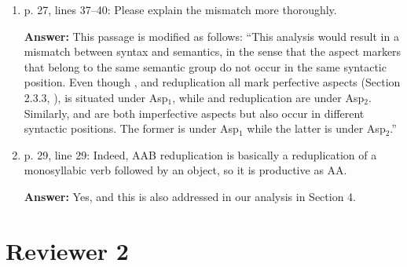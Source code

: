 \documentclass[fleqn,twoside]{article}
\begin{document}
\begin{enumerate}
\item p. 27, lines 37--40: Please explain the mismatch more thoroughly.

\noindent
\textbf{Answer:} This passage is modified as follows: 
``This analysis would result in a mismatch between syntax and semantics, 
in the sense that the aspect markers that belong to the same semantic group do not occur in the same syntactic position. 
Even though ,  and reduplication all mark perfective aspects (Section 2.3.3, \citealt{Dai1997, XiaoMcEnery2004}),
 is situated under Asp$_1$, while  and reduplication are under Asp$_2$.
Similarly,  and  are both imperfective aspects but also occur in different syntactic positions.
The former is under Asp$_1$ while the latter is under Asp$_2$.''

\item p. 29, line 29: Indeed, AAB reduplication is basically a reduplication of a monosyllabic verb followed
by an object, so it is productive as AA.

\noindent
\textbf{Answer:} Yes, and this is also addressed in our analysis in Section 4.

\end{enumerate}

\section{Reviewer 2}\label{sec:2}
\end{document}
